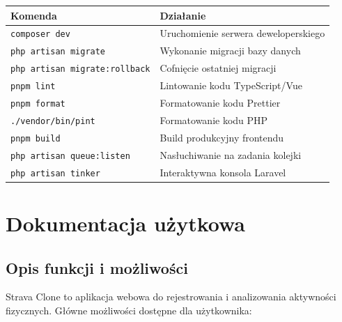 \documentclass[12pt,a4paper]{report}
\begin{document}
\begin{center}
\begin{tabular}{|l|l|}
\hline
\textbf{Komenda}                      & \textbf{Działanie}                       \\
\hline
\texttt{composer dev}                 & Uruchomienie serwera deweloperskiego      \\
\texttt{php artisan migrate}          & Wykonanie migracji bazy danych            \\
\texttt{php artisan migrate:rollback} & Cofnięcie ostatniej migracji              \\
\texttt{pnpm lint}                    & Lintowanie kodu TypeScript/Vue            \\
\texttt{pnpm format}                  & Formatowanie kodu Prettier                \\
\texttt{./vendor/bin/pint}            & Formatowanie kodu PHP                     \\
\texttt{pnpm build}                   & Build produkcyjny frontendu               \\
\texttt{php artisan queue:listen}     & Nasłuchiwanie na zadania kolejki          \\
\texttt{php artisan tinker}           & Interaktywna konsola Laravel              \\
\hline
\end{tabular}
\end{center}

\chapter{Dokumentacja użytkowa}
\label{ch:uzytkownik}

\section{Opis funkcji i możliwości}

Strava Clone to aplikacja webowa do rejestrowania i analizowania aktywności fizycznych. Główne możliwości dostępne dla użytkownika:
\end{document}
